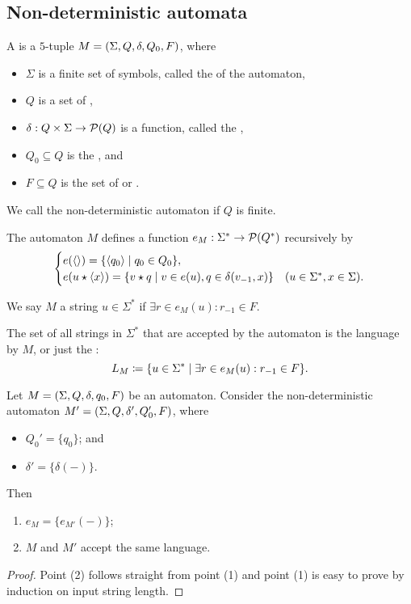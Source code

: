 \subsection{Non-deterministic automata}
\begin{definition}
A  is a $5$-tuple $M = \sSet{\Sigma, Q, \delta, Q_0, F}$, where
\begin{itemize}
\item $\Sigma$ is a finite set of symbols, called the  of the automaton,
\item $Q$ is a set of ,
\item $\delta: Q\times \Sigma \to \operatorname{\mathcal{P}}(Q)$ is a function, called the ,
\item $Q_0\subseteq Q$ is the , and
\item $F\subseteq Q$ is the set of  or .
\end{itemize}
We call the non-deterministic automaton  if $Q$ is finite.

The automaton $M$ defines a function $e_M: \Sigma^* \to \operatorname{\mathcal{P}}(Q^*)$ recursively by
\[ \begin{cases}
e(\seq{}) = \setbuilder{\seq{q_0}}{q_0\in Q_0}, \\
e(u\concat \seq{x}) = \setbuilder{v\concat q}{v\in e(u), q\in \delta(v_{-1}, x)} & (u\in \Sigma^*, x\in \Sigma).
\end{cases} \]

We say $M$  a string $u\in \Sigma^*$ if $\exists r\in e_M(u): r_{-1} \in F$.

The set of all strings in $\Sigma^*$ that are accepted by the automaton is the language  by $M$, or just the :
\[ L_M \defeq \setbuilder{u\in\Sigma^*}{\exists r\in e_M(u): r_{-1} \in F}. \]
\end{definition}

\begin{lemma} \label{automatonAsNDAutomaton}
Let $M = \sSet{\Sigma, Q, \delta, q_0, F}$ be an automaton. Consider the non-deterministic automaton $M' = \sSet{\Sigma, Q, \delta', Q_0', F}$, where
\begin{itemize}
\item $Q_0' = \{q_0\}$; and
\item $\delta' = \{\delta(-)\}$.
\end{itemize}
Then
\begin{enumerate}
\item $e_{M} = \{e_{M'}(-)\}$;
\item $M$ and $M'$ accept the same language.
\end{enumerate}
\end{lemma}
\begin{proof}
Point (2) follows straight from point (1) and point (1) is easy to prove by induction on input string length.
\end{proof}

